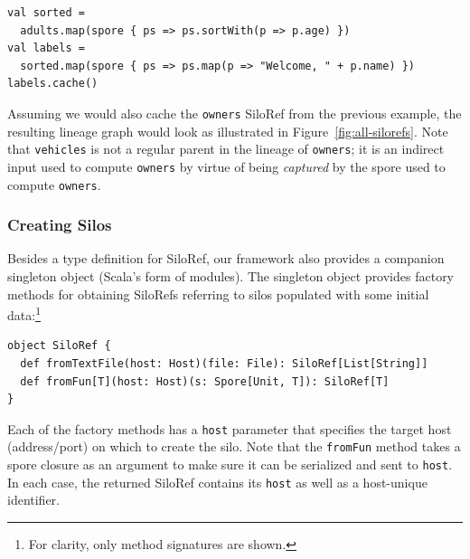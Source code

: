 \documentclass[preprint]{sigplanconf}
\theoremstyle{definition}
\theoremstyle{definition}
\begin{document}
\begin{lstlisting}
val sorted =
  adults.map(spore { ps => ps.sortWith(p => p.age) })
val labels =
  sorted.map(spore { ps => ps.map(p => "Welcome, " + p.name) })
labels.cache()
\end{lstlisting}
\noindent
Assuming we would also cache the \verb|owners| SiloRef from the previous
example, the resulting lineage graph would look as illustrated in
Figure~\ref{fig:all-silorefs}. Note that \verb|vehicles| is not a regular
parent in the lineage of \verb|owners|; it is an indirect input used to
compute \verb|owners| by virtue of being {\em captured} by the spore used to
compute \verb|owners|.






\subsubsection{Creating Silos}
\label{sec:creating-silos}

Besides a type definition for SiloRef, our framework also provides a companion
singleton object (Scala's form of modules). The singleton object provides
factory methods for obtaining SiloRefs referring to silos populated with some
initial data:\footnote{For clarity, only method signatures are shown.}

\begin{lstlisting}
object SiloRef {
  def fromTextFile(host: Host)(file: File): SiloRef[List[String]]
  def fromFun[T](host: Host)(s: Spore[Unit, T]): SiloRef[T]
}
\end{lstlisting}
\noindent
Each of the factory methods has a \verb|host| parameter that specifies the
target host (address/port) on which to create the silo. Note that the
\verb|fromFun| method takes a spore closure as an argument to make sure it can
be serialized and sent to \verb|host|. In each case, the returned SiloRef
contains its \verb|host| as well as a host-unique identifier.
\end{document}
